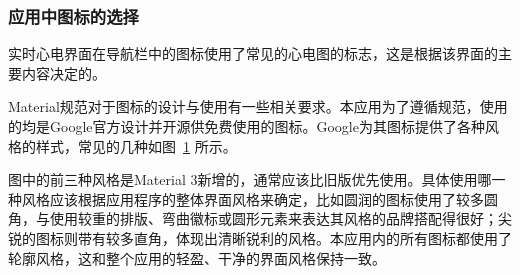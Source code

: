 \subsubsection{应用中图标的选择}\label{subsubsec:icons}

实时心电界面在导航栏中的图标使用了常见的心电图的标志，这是根据该界面的主要内容决定的。

Material规范对于图标的设计与使用有一些相关要求。本应用为了遵循规范，使用的均是Google官方设计并开源供免费使用的图标。Google为其图标提供了各种风格的样式，常见的几种如图~\ref{fig:icons} 所示。

\begin{figure}[ht]
    \centering
    \label{fig:icons}
\end{figure}

图中的前三种风格是Material 3新增的，通常应该比旧版优先使用。具体使用哪一种风格应该根据应用程序的整体界面风格来确定，比如圆润的图标使用了较多圆角，与使用较重的排版、弯曲徽标或圆形元素来表达其风格的品牌搭配得很好；尖锐的图标则带有较多直角，体现出清晰锐利的风格。本应用内的所有图标都使用了轮廓风格，这和整个应用的轻盈、干净的界面风格保持一致。

